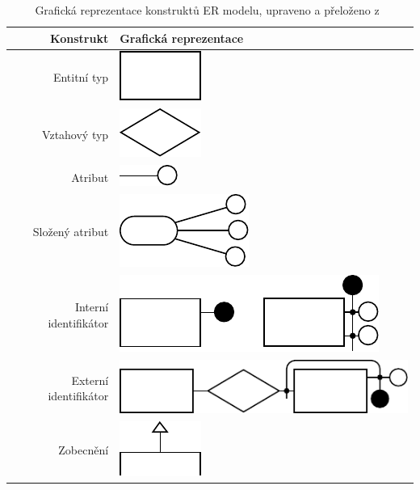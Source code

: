 \begin{table}[!htb]
  \centering
  \begin{tabular}{@{}rm{7cm}@{}} \toprule
    Konstrukt             & Grafická reprezentace                                     \\ \midrule
    Entitní typ           & {\centering\includegraphics{../img/er-model/entity.pdf}}  \\
    Vztahový typ          & \includegraphics{../img/er-model/relationship.pdf}        \\
    Atribut               & \includegraphics{../img/er-model/attribute.pdf}           \\
    Složený atribut       & \includegraphics{../img/er-model/composite-attribute.pdf} \\
    Interní identifikátor & \includegraphics{../img/er-model/identifier.pdf}          \\
    Externí identifikátor & \includegraphics{../img/er-model/external-identifier.pdf} \\
    Zobecnění             & \includegraphics{../img/er-model/generalization.pdf}      \\ \bottomrule
  \end{tabular}
  \caption{Grafická reprezentace konstruktů ER modelu, upraveno a přeloženo z~\cite[s.~164]{atzeni_database_1999}}
  \label{tab:er-constructs}
\end{table}

